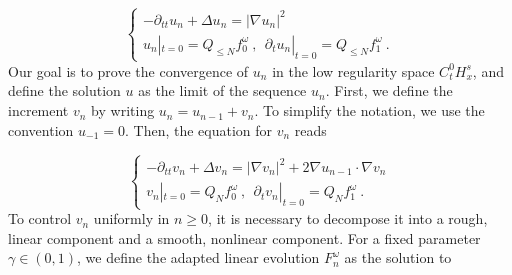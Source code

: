 \documentclass[11pt]{article}
\begin{document}
 \begin{equation}\label{intro:eq_un}
\begin{cases}
 -\partial_{tt} u_n + \Delta u_n = |\nabla u_n|^2\\
 u_n|_{t=0} = Q_{\leq N} f_0^\omega~,~~\partial_t u_n |_{t=0} = Q_{\leq N} f_1^\omega ~.
\end{cases}
\end{equation}
Our goal is to prove the convergence of \( u_n \) in the low regularity space \( C_t^0 H_x^s \), and define the solution \( u \) as the limit of the sequence \( u_n \). First, we define the increment \( v_n \) by writing \( u_n = u_{n-1} + v_n \). To simplify the notation, we use the convention \( u_{-1} = 0\). Then, the equation for \( v_n \) reads 

\begin{equation}\label{intro:eq_vn}
\begin{cases}
 -\partial_{tt} v_n + \Delta v_n = |\nabla v_n|^2 + 2 \nabla u_{n-1} \cdot \nabla v_n   \\
 v_n|_{t=0} = Q_{N} f_0^\omega~,~ ~ \partial_t v_n |_{t=0} = Q_{N} f_1^\omega ~.
\end{cases}
\end{equation}
To control \( v_n \) uniformly in \( n \geq 0 \), it is necessary to decompose it into a rough, linear component and a smooth, nonlinear component. For a fixed parameter \( \gamma \in (0,1) \), we define the adapted linear evolution \( F_n^\omega \) as the solution to 
\end{document}
